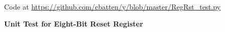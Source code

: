 
\begin{figure}

  

  \centerline{\small Code at
    \url{https://github.com/cbatten/y/blob/master/RegRst_test.py}}

  \caption{\textbf{Unit Test for Eight-Bit Reset Register}}
  \label{code-tut3-regincr-reg-test}

\end{figure}

